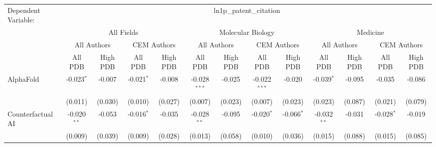 \begingroup
\centering
\begin{tabular}{lcccccccccccc}
   \tabularnewline \midrule \midrule
   Dependent Variable: & \multicolumn{12}{c}{ln1p\_patent\_citation}\\
 & \multicolumn{4}{c}{All Fields} & \multicolumn{4}{c}{Molecular Biology} & \multicolumn{4}{c}{Medicine} \\
\cmidrule(lr){2-5} \cmidrule(lr){6-9} \cmidrule(lr){10-13}
 & \multicolumn{2}{c}{All Authors} & \multicolumn{2}{c}{CEM Authors} & \multicolumn{2}{c}{All Authors} & \multicolumn{2}{c}{CEM Authors} & \multicolumn{2}{c}{All Authors} & \multicolumn{2}{c}{CEM Authors} \\
\cmidrule(lr){2-3} \cmidrule(lr){4-5} \cmidrule(lr){6-7} \cmidrule(lr){8-9} \cmidrule(lr){10-11} \cmidrule(lr){12-13}
 & \multicolumn{1}{c}{All PDB} & \multicolumn{1}{c}{High PDB} & \multicolumn{1}{c}{All PDB} & \multicolumn{1}{c}{High PDB} & \multicolumn{1}{c}{All PDB} & \multicolumn{1}{c}{High PDB} & \multicolumn{1}{c}{All PDB} & \multicolumn{1}{c}{High PDB} & \multicolumn{1}{c}{All PDB} & \multicolumn{1}{c}{High PDB} & \multicolumn{1}{c}{All PDB} & \multicolumn{1}{c}{High PDB} \\
\cmidrule(lr){2-2} \cmidrule(lr){3-3} \cmidrule(lr){4-4} \cmidrule(lr){5-5} \cmidrule(lr){6-6} \cmidrule(lr){7-7} \cmidrule(lr){8-8} \cmidrule(lr){9-9} \cmidrule(lr){10-10} \cmidrule(lr){11-11} \cmidrule(lr){12-12} \cmidrule(lr){13-13}
   AlphaFold                                                  & -0.023$^{*}$   & -0.007         & -0.021$^{*}$   & -0.008         & -0.028$^{***}$ & -0.025        & -0.022$^{***}$ & -0.020        & -0.039$^{*}$   & -0.095         & -0.035         & -0.086\\   
                                                              & (0.011)        & (0.030)        & (0.010)        & (0.027)        & (0.007)        & (0.023)       & (0.007)        & (0.023)       & (0.023)        & (0.087)        & (0.021)        & (0.079)\\   
   Counterfactual AI                                          & -0.020$^{**}$  & -0.053         & -0.016$^{*}$   & -0.035         & -0.028$^{**}$  & -0.095        & -0.020$^{*}$   & -0.066$^{*}$  & -0.032$^{**}$  & -0.031         & -0.028$^{*}$   & -0.019\\   
                                                              & (0.009)        & (0.039)        & (0.009)        & (0.028)        & (0.013)        & (0.058)       & (0.010)        & (0.036)       & (0.015)        & (0.088)        & (0.015)        & (0.085)\\   

\end{tabular}
